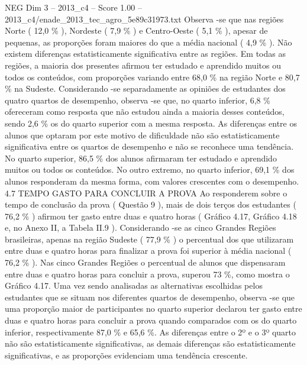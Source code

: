 \begin{textsample}{NEG Dim 3 – 2013\_c4 – Score 1.00 – 2013\_c4/enade\_2013\_tec\_agro\_5e89c31973.txt}
Observa -se que nas regiões Norte ( 12,0 \% ), Nordeste ( 7,9 \% ) e Centro-Oeste ( 5,1 \% ), apesar de pequenas, as proporções foram maiores do que a média nacional ( 4,9 \% ).
Não existem diferenças estatisticamente significativa entre as regiões.
Em todas as regiões, a maioria dos presentes afirmou ter estudado e aprendido muitos ou todos os conteúdos, com proporções variando entre 68,0 \% na região Norte e 80,7 \% na Sudeste.
Considerando -se separadamente as opiniões de estudantes dos quatro quartos de desempenho, observa -se que, no quarto inferior, 6,8 \% ofereceram como resposta que não estudou ainda a maioria desses conteúdos, sendo 2,6 \% os do quarto superior com a mesma resposta.
As diferenças entre os alunos que optaram por este motivo de dificuldade não são estatisticamente significativa entre os quartos de desempenho e não se reconhece uma tendência.
No quarto superior, 86,5 \% dos alunos afirmaram ter estudado e aprendido muitos ou todos os conteúdos.
No outro extremo, no quarto inferior, 69,1 \% dos alunos responderam da mesma forma, com valores crescentes com o desempenho. 4.7 TEMPO GASTO PARA CONCLUIR A PROVA Ao responderem sobre o tempo de conclusão da prova ( Questão 9 ), mais de dois terços dos estudantes ( 76,2 \% ) afirmou ter gasto entre duas e quatro horas ( Gráfico 4.17, Gráfico 4.18 e, no Anexo II, a Tabela II.9 ).
Considerando -se as cinco Grandes Regiões brasileiras, apenas na região Sudeste ( 77,9 \% ) o percentual dos que utilizaram entre duas e quatro horas para finalizar a prova foi superior à média nacional ( 76,2 \% ).
Nas cinco Grandes Regiões o percentual de alunos que dispensaram entre duas e quatro horas para concluir a prova, superou 73 \%, como mostra o Gráfico 4.17.
Uma vez sendo analisadas as alternativas escolhidas pelos estudantes que se situam nos diferentes quartos de desempenho, observa -se que uma proporção maior de participantes no quarto superior declarou ter gasto entre duas e quatro horas para concluir a prova quando comparados com os do quarto inferior, respectivamente 87,0 \% e 65,6 \%.
As diferenças entre o 2º e o 3º quarto não são estatisticamente significativas, as demais diferenças são estatisticamente significativas, e as proporções evidenciam uma tendência crescente.

\end{textsample}
